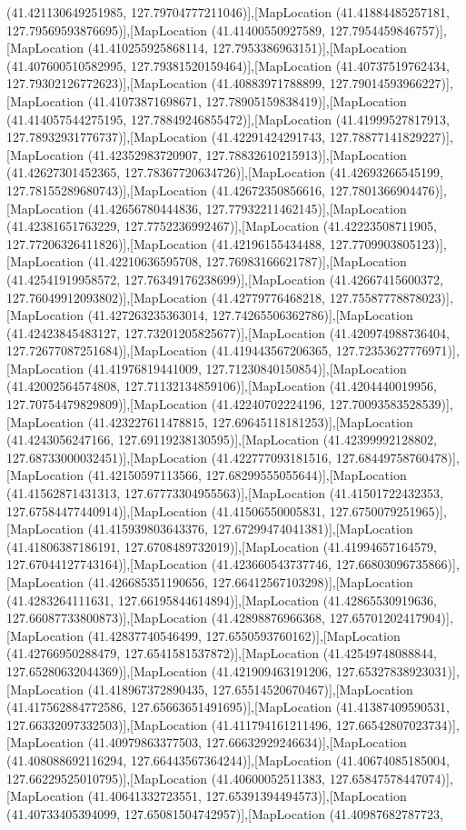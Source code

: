 (41.421130649251985, 127.79704777211046)],[MapLocation (41.41884485257181, 127.79569593876695)],[MapLocation (41.41400550927589, 127.7954459846757)],[MapLocation (41.410255925868114, 127.7953386963151)],[MapLocation (41.407600510582995, 127.79381520159464)],[MapLocation (41.40737519762434, 127.79302126772623)],[MapLocation (41.40883971788899, 127.79014593966227)],[MapLocation (41.41073871698671, 127.78905159838419)],[MapLocation (41.414057544275195, 127.78849246855472)],[MapLocation (41.41999527817913, 127.78932931776737)],[MapLocation (41.42291424291743, 127.78877141829227)],[MapLocation (41.42352983720907, 127.78832610215913)],[MapLocation (41.42627301452365, 127.78367720634726)],[MapLocation (41.42693266545199, 127.78155289680743)],[MapLocation (41.42672350856616, 127.7801366904476)],[MapLocation (41.42656780444836, 127.77932211462145)],[MapLocation (41.42381651763229, 127.7752236992467)],[MapLocation (41.42223508711905, 127.77206326411826)],[MapLocation (41.42196155434488, 127.7709903805123)],[MapLocation (41.42210636595708, 127.76983166621787)],[MapLocation (41.42541919958572, 127.76349176238699)],[MapLocation (41.42667415600372, 127.76049912093802)],[MapLocation (41.42779776468218, 127.75587778878023)],[MapLocation (41.427263235363014, 127.74265506362786)],[MapLocation (41.42423845483127, 127.73201205825677)],[MapLocation (41.420974988736404, 127.72677087251684)],[MapLocation (41.419443567206365, 127.72353627776971)],[MapLocation (41.41976819441009, 127.71230840150854)],[MapLocation (41.42002564574808, 127.71132134859106)],[MapLocation (41.4204440019956, 127.70754479829809)],[MapLocation (41.42240702224196, 127.70093583528539)],[MapLocation (41.423227611478815, 127.69645118181253)],[MapLocation (41.4243056247166, 127.69119238130595)],[MapLocation (41.42399992128802, 127.68733000032451)],[MapLocation (41.422777093181516, 127.68449758760478)],[MapLocation (41.42150597113566, 127.68299555055644)],[MapLocation (41.41562871431313, 127.67773304955563)],[MapLocation (41.41501722432353, 127.67584477440914)],[MapLocation (41.41506550005831, 127.6750079251965)],[MapLocation (41.415939803643376, 127.67299474041381)],[MapLocation (41.41806387186191, 127.6708489732019)],[MapLocation (41.41994657164579, 127.67044127743164)],[MapLocation (41.423660543737746, 127.66803096735866)],[MapLocation (41.426685351190656, 127.66412567103298)],[MapLocation (41.4283264111631, 127.66195844614894)],[MapLocation (41.42865530919636, 127.66087733800873)],[MapLocation (41.42898876966368, 127.65701202417904)],[MapLocation (41.42837740546499, 127.6550593760162)],[MapLocation (41.42766950288479, 127.6541581537872)],[MapLocation (41.42549748088844, 127.65280632044369)],[MapLocation (41.421909463191206, 127.65327838923031)],[MapLocation (41.418967372890435, 127.65514520670467)],[MapLocation (41.417562884772586, 127.65663651491695)],[MapLocation (41.41387409590531, 127.66332097332503)],[MapLocation (41.411794161211496, 127.66542807023734)],[MapLocation (41.40979863377503, 127.66632929246634)],[MapLocation (41.408088692116294, 127.66443567364244)],[MapLocation (41.40674085185004, 127.66229525010795)],[MapLocation (41.40600052511383, 127.65847578447074)],[MapLocation (41.40641332723551, 127.65391394494573)],[MapLocation (41.40733405394099, 127.65081504742957)],[MapLocation (41.40987682787723, 